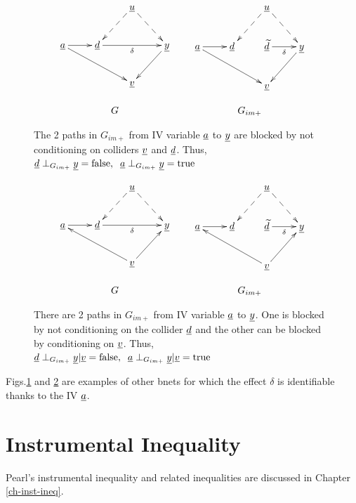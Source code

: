 \begin{figure}[h!]
$$
\begin{array}{ccc}
\xymatrix{
&&\rvu\ar@{-->}[dl]\ar@{-->}[dr]
\\
\rva\ar[r]\ar[drr]
&\rvd\ar[rr]_\delta
&&\rvy\ar[dl]
\\
&&\rvv
}
&&
\xymatrix{
&&\rvu\ar@{-->}[dl]\ar@{-->}[dr]
\\
\rva\ar[r]\ar[drr]
&\rvd&
\rvtd\ar[r]_\delta
&\rvy\ar[dl]
\\
&&\rvv
}
\\
\\
G&&G_{im+}
\end{array}
$$
\caption{The 2 paths in $G_{im+}$
from
IV variable ${\underline{a}}$
to ${\underline{y}}$ are blocked by
not conditioning on colliders ${\underline{v}}$
and ${\underline{d}}$. Thus,
$
{\underline{d}}\perp_{G_{im+}} {\underline{y}} =\text{false}, 
\;\; {\underline{a}}\perp_{G_{im+}} {\underline{y}}= \text{true}
$
}
\label{fig-iv-G-im-blocked}
\end{figure}




\begin{figure}[h!]
$$
\begin{array}{ccc}
\xymatrix{
&&\rvu\ar@{-->}[dl]\ar@{-->}[dr]
\\
\rva\ar[r]
&\rvd\ar[rr]_\delta
&&\rvy
\\
&&\rvv\ar[ur]\ar[ull]
}
&&
\xymatrix{
&&\rvu\ar@{-->}[dl]\ar@{-->}[dr]
\\
\rva\ar[r]
&\rvd
&
\rvtd\ar[r]_\delta
&\rvy
\\
&&\rvv\ar[ur]\ar[ull]
}
\\
\\
G&&G_{im+}
\end{array}
$$
\caption{
There are 2 paths in $G_{im+}$
from
IV variable ${\underline{a}}$
to ${\underline{y}}$. One is
blocked
by not conditioning on the collider ${\underline{d}}$
and the other
can be blocked by 
conditioning on ${\underline{v}}$. Thus,
$
{\underline{d}}\perp_{G_{im+}} {\underline{y}}|{\underline{v}} =\text{false}, 
\;\; {\underline{a}}\perp_{G_{im+}} {\underline{y}}|{\underline{v}}= \text{true}
$
}
\label{fig-iv-G-im-strata}
\end{figure}

Figs.\ref{fig-iv-G-im-blocked}
and \ref{fig-iv-G-im-strata}
are examples of 
other bnets 
for which the
effect $\delta$
is identifiable
thanks
to the
IV ${\underline{a}}$.


\section{Instrumental Inequality}
Pearl's instrumental inequality
and related inequalities are discussed in
 Chapter
 \ref{ch-inst-ineq}.


